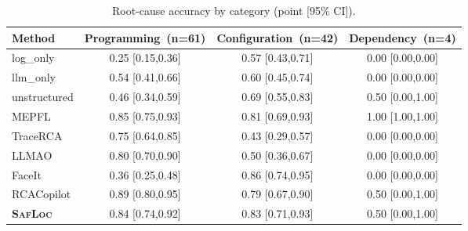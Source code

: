 \begin{table}[t]
  \centering
  \caption{Root-cause accuracy by category (point [95\% CI]).}
  \label{tab:percat_rca}
  \setlength{\tabcolsep}{4pt}
  \footnotesize
  \begin{tabular}{lccc}
    \toprule
    Method & Programming~(n=61) & Configuration~(n=42) & Dependency~(n=4) \\
    \midrule
    log\_only & 0.25 [0.15,0.36] & 0.57 [0.43,0.71] & 0.00 [0.00,0.00] \\
    llm\_only & 0.54 [0.41,0.66] & 0.60 [0.45,0.74] & 0.00 [0.00,0.00] \\
    unstructured & 0.46 [0.34,0.59] & 0.69 [0.55,0.83] & 0.50 [0.00,1.00] \\
    MEPFL & 0.85 [0.75,0.93] & 0.81 [0.69,0.93] & 1.00 [1.00,1.00] \\
    TraceRCA & 0.75 [0.64,0.85] & 0.43 [0.29,0.57] & 0.00 [0.00,0.00] \\
    LLMAO & 0.80 [0.70,0.90] & 0.50 [0.36,0.67] & 0.00 [0.00,0.00] \\
    FaceIt & 0.36 [0.25,0.48] & 0.86 [0.74,0.95] & 0.00 [0.00,0.00] \\
    RCACopilot & 0.89 [0.80,0.95] & 0.79 [0.67,0.90] & 0.50 [0.00,1.00] \\
    \midrule
    \textbf{\textsc{SafLoc}} & 0.84 [0.74,0.92] & 0.83 [0.71,0.93] & 0.50 [0.00,1.00] \\
    \bottomrule
  \end{tabular}
\end{table}
